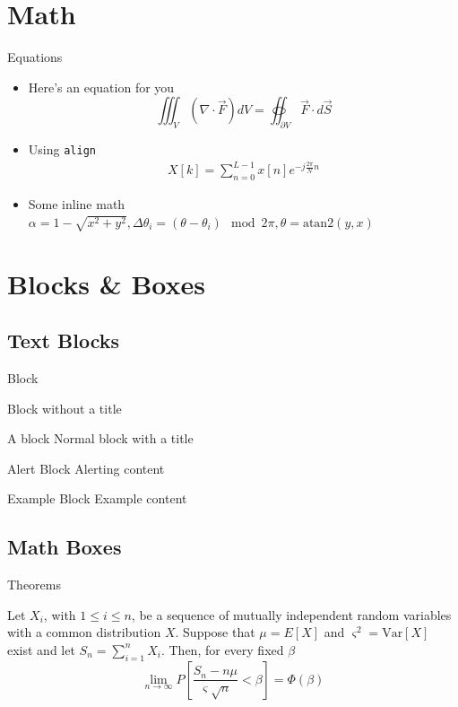 \documentclass[aspectratio=169,envcountsect]{beamer}    %
\begin{document}
\section{Math}
\begin{frame}{Equations}
 \begin{itemize}
  \item Here's an equation for you
        \[
         \iiint_V \left( \nabla \cdot \vec{F} \right) dV = \oiint_{\partial V} \vec{F}\cdot d\vec{S}
        \]
  \item Using \texttt{align}
        \begin{align}
         X[k] = \sum_{n=0}^{L-1}x[n]e^{-j\frac{2\pi}{N}n}
        \end{align}
  \item Some inline math \(\alpha=1-\sqrt{x^2+y^2}, \Delta\theta_i=(\theta-\theta_i)\mod 2\pi, \theta=\text{atan2}(y,x)\)
 \end{itemize}
\end{frame}

\section{Blocks \& Boxes}
\subsection{Text Blocks}
\begin{frame}{Block}
 \begin{block}{}
  Block without a title
 \end{block}
 \begin{block}{A block}
  Normal block with a title
 \end{block}
 \begin{alertblock}{Alert Block}
  Alerting content
 \end{alertblock}
 \begin{exampleblock}{Example Block}
  Example content
 \end{exampleblock}
\end{frame}

\subsection{Math Boxes}
\begin{frame}{Theorems}
 \begin{theorem}
  Let \(X_{i}\), with \(1 \leq i \leq n\), be a sequence of mutually independent random variables with a common distribution \(X\). Suppose that \(\mu = E[X]\) and \(\varsigma^2=\text{Var}[X]\) exist and let \(S_n = \sum_{i=1}^n X_i\). Then, for every fixed \(\beta \)
  \[
   \lim_{n\to\infty} P\left[\frac{S_n - n\mu}{\varsigma\sqrt{n}} < \beta \right] = \Phi(\beta)
  \]
 \end{theorem}
\end{frame}
\end{document}
